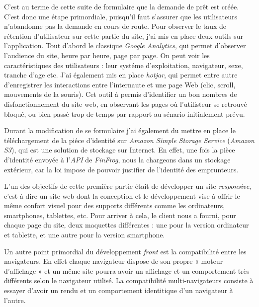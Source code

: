 \bigskip

C'est au terme de cette suite de formulaire que la demande de prêt est
créée. C'est donc une étape primordiale, puisqu'il faut s'assurer que
les utilisateurs n'abandonne pas la demande en cours de route. Pour
observer le taux de rétention d'utilisateur sur cette partie du site,
j'ai mis en place deux outils sur l'application. Tout d'abord le
classique \emph{Google Analytics}, qui permet d'observer l'audience du
site, heure par heure, page par page. On peut voir les caractéristiques
des utilisateurs : leur systéme d'exploitation, navigateur, sexe,
tranche d'age etc. J'ai également mis en place \emph{hotjar}, qui permet
entre autre d'enregistrer les interactions entre l'internaute et une
page Web (clic, scroll, mouvements de la souris). Cet outil à permis
d'identifier un bon nombres de disfonctionnement du site web, en
observant les pages où l'utilisteur se retrouvé bloqué, ou bien passé
trop de temps par rapport au sénario initialement prévu.

\bigskip

Durant la modification de se formulaire j'ai également du mettre en
place le téléchargement de la piéce d'identité sur \emph{Amazon Simple
Storage Service} (\emph{Amazon S3}), qui est une solution de stockage
sur Internet. En effet, une fois la pièce d'identité envoyée à
l'\emph{API} de \emph{FinFrog}, nous la chargeons dans un stockage
extérieur, car la loi impose de pouvoir justifier de l'identité des
emprunteurs.

\bigskip

L'un des objectifs de cette première partie était de développer un site
\emph{responsive}, c'est à dire un site web dont la conception et le
développement vise à offrir le même confort visuel pour des supports
différents comme les ordinateurs, smartphones, tablettes, etc. Pour
arriver à cela, le client nous a fourni, pour chaque page du site, deux
maquettes différentes : une pour la version ordinateur et tablette, et
une autre pour la version smartphone.

\bigskip

Un autre point primordial du développement \emph{front} est la
compatibilité entre les navigateurs. En effet chaque navigateur dispose
de son propre « moteur d'affichage » et un même site pourra avoir un
affichage et un comportement très différents selon le navigateur
utilisé. La compatibilité multi-navigateurs consiste à essayer d'avoir
un rendu et un comportement identitique d'un navigateur à l'autre.

